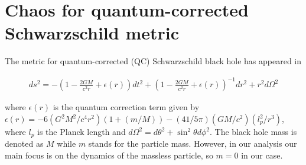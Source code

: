 \documentclass[aps,prd,showpacs,nofootinbib,floats,floatfix,preprintnumbers,groupedaddress,twocolumn]{revtex4-1}
\begin{document}
\section{Chaos for quantum-corrected Schwarzschild metric}
%
%
%
%
\par\noindent
The metric for quantum-corrected (QC) Schwarzschild black hole has appeared in \cite{don}
\begin{widetext}
	\begin{eqnarray}
	ds^2 =- \left(1-\frac{2GM}{c^2r}+\epsilon(r)\right)dt^2 + \left(1-\frac{2GM}{c^2r}+\epsilon(r)\right)^{-1} dr^2 + r^2 d\Omega^2
	\end{eqnarray} 
\end{widetext}
where $\epsilon(r)$ is the quantum correction term  given by $\epsilon(r)= -6\left(G^2M^2/c^4r^2\right)(1+(m/M))-(41/5\pi)(GM/c^2)(l_p^2/r^3)$, where $l_p$ is the Planck length and $d\Omega^2 = d\theta^2 + \sin^2\theta d\phi^2$. The black hole mass is  denoted as $M$  while $m$ stands for the particle mass. However, in our analysis our main focus is on the dynamics of the massless particle, so $m=0$ in our case.\\
%
%
%
%
\end{document}
